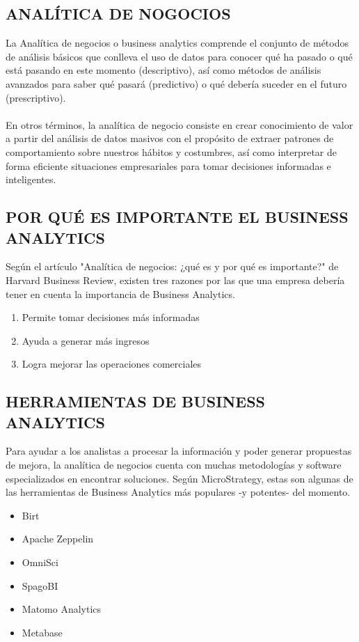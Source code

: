\documentclass[twoside,twocolumn]{article}
\begin{document}
\subsection{ANALÍTICA DE NOGOCIOS}
La Analítica de negocios o business analytics comprende el conjunto de métodos de análisis básicos que conlleva el uso de datos para conocer qué ha pasado o qué está pasando en este momento (descriptivo), así como métodos de análisis avanzados para saber qué pasará (predictivo) o qué debería suceder en el futuro (prescriptivo).\\ \\
En otros términos, la analítica de negocio consiste en crear conocimiento de valor a partir del análisis de datos masivos con el propósito de extraer patrones de comportamiento sobre nuestros hábitos y costumbres, así como interpretar de forma eficiente situaciones empresariales para tomar decisiones informadas e inteligentes.

\subsection{POR QUÉ ES IMPORTANTE EL BUSINESS ANALYTICS}
Según el artículo "Analítica de negocios: ¿qué es y por qué es importante?" de Harvard Business Review, existen tres razones por las que una empresa debería tener en cuenta la importancia de Business Analytics.
\begin{enumerate}
    \item Permite tomar decisiones más informadas
    \item Ayuda a generar más ingresos
    \item Logra mejorar las operaciones comerciales
\end{enumerate}

\subsection{HERRAMIENTAS DE BUSINESS ANALYTICS}
Para ayudar a los analistas a procesar la información y poder generar propuestas de mejora, la analítica de negocios cuenta con muchas metodologías y software especializados en encontrar soluciones. Según MicroStrategy, estas son algunas de las herramientas de Business Analytics más populares -y potentes- del momento.
\begin{itemize}
    \item Birt
    \item Apache Zeppelin
    \item OmniSci
    \item SpagoBI
    \item Matomo Analytics
    \item Metabase
\end{itemize}
\end{document}
